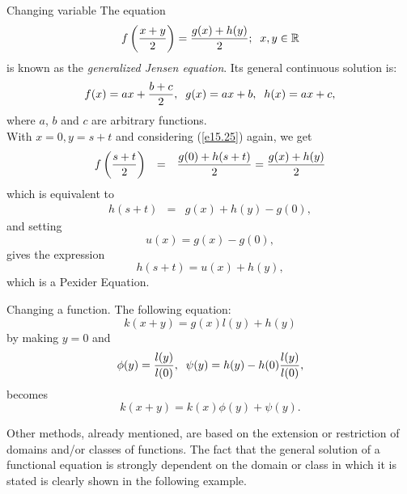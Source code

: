 \documentclass[
	11pt, %
	fleqn, %
	a4paper, %
]{LegrandOrangeBook}
\newcommand{\R}{\mathbb{R}}
\begin{document}
\begin{example}{Changing variable}\label{gjen}
The equation
\begin{equation}\label{e15.25}
f\left({{x+y} \over 2}\right)={{g(x)+h(y)} \over 2};\;\;x,y\in \R
\end{equation}
is known as the {\it generalized Jensen equation}. Its general
continuous solution is:
\begin{equation}\label{jensen20}
f(x)=ax + {{b+c} \over 2},\;\;g(x)=ax+b,\;\;h(x)=ax+c,
\end{equation}
where $a$, $b$ and $c$ are arbitrary functions.\\

 With $x=0, y=s+t$ and considering
(\ref{e15.25}) again, we get
\begin{equation}
\begin{array}{rll}
f\left({\displaystyle {{s+t} \over 2}}\right) &=& {\displaystyle {{g(0)+h(s+t)} \over
2}}={\displaystyle {{g(x)+h(y)}
\over 2}}
\end{array}
\end{equation}
which is equivalent to
\begin{equation}
\begin{array}{rll}
h(s+t) &=& g(x)+h(y)-g(0),
\end{array}
\end{equation}
and setting
\begin{equation}
u(x)=g(x)-g(0),
\end{equation}
gives the expression
\begin{equation}
h(s+t)=u(x)+h(y),
\end{equation}
which is a Pexider Equation.
\end{example}

\begin{example}{Changing a function. }
The following equation:
\begin{displaymath}
k(x+y)=g(x)l(y)+h(y)
\end{displaymath}
by making $y=0$ and
\begin{displaymath}
\phi(y)={{l(y)}\over{l(0)}},\;\;\psi(y)=h(y)-h(0){{l(y)}\over{l(0)}},
\end{displaymath}
becomes
\begin{displaymath}
k(x+y)=k(x)\phi(y)+\psi(y).
\end{displaymath}
\end{example}

Other methods, already mentioned, are based on the extension or
restriction of domains and/or classes of functions. The fact that
the general solution of a functional equation is strongly
dependent on the domain or class in which it is stated is clearly
shown in the following example.
\end{document}
